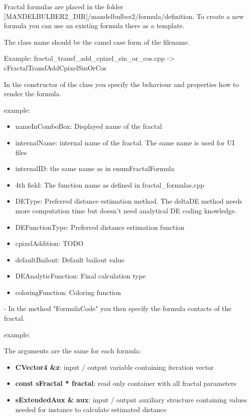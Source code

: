 Fractal formulas are placed in the folder [MANDELBULBER2\_DIR]/mandelbulber2/formula/definition.
To create a new formula you can use an existing formula there as a template.

The class name should be the camel case form of the filename.

Example:
fractal\_transf\_add\_cpixel\_sin\_or\_cos.cpp -> cFractalTransfAddCpixelSinOrCos

In the constructor of the class you specify the behaviour and properties how to render the formula.

example:


\begin{itemize}
	\item nameInComboBox: Displayed name of the fractal
	\item internalName: internal name of the fractal. The same name is used for UI files
	\item internalID: the same name as in enumFractalFormula
	\item 4th field: The function name as defined in fractal\_formulas.cpp
	\item DEType: Preferred distance estimation method. The deltaDE method needs more computation time but doesn't need analytical DE coding knowledge.
	\item DEFunctionType: Preferred distance estimation function
	\item cpixelAddition: TODO
	\item defaultBailout: Default bailout value
	\item DEAnalyticFunction: Final calculation type
	\item coloringFunction: Coloring function
\end{itemize}

- In the method "FormulaCode" you then specify the formula contacts of the fractal.

example:


The arguments are the same for each formula:
\begin{itemize}
	\item \textbf{CVector4 \&z}: input / output variable containing iteration vector
	\item \textbf{const sFractal * fractal}: read only container with all fractal parameters
	\item \textbf{sExtendedAux \& aux}: input / output auxiliary structure containing values 
		needed for instance to calculate estimated distance
\end{itemize}

